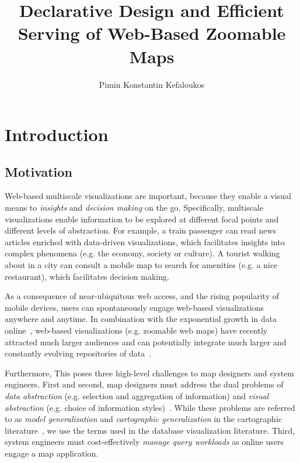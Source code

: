 \documentclass[11pt, oneside]{report}   	%
\title{Declarative Design and Efficient Serving of Web-Based Zoomable Maps}
\author{Pimin Konstantin Kefaloukos}
\begin{document}
\maketitle

\tableofcontents

\chapter{Introduction}

\section{Motivation}
Web-based multiscale visualizations are important, because they enable a visual means to \emph{insights} and \emph{decision making} on the go. Specifically, multiscale visualizations enable information to be explored at different focal points and different levels of abstraction. For example, a train passenger can read news articles enriched with data-driven visualizations, which facilitates insights into complex phenomena (e.g. the economy, society or culture). A tourist walking about in a city can consult a mobile map to search for amenities (e.g. a nice restaurant), which facilitates decision making.

As a consequence of near-ubiquitous web access, and the rising popularity of mobile devices, users can spontaneously engage web-based visualizations anywhere and anytime. In combination with the exponential growth in data online~\cite{foo,foo,foo}, web-based visualizations (e.g. zoomable web maps) have recently attracted much larger audiences and can potentially integrate much larger and constantly evolving repositories of data~\cite{gst, foo}.


Furthermore, 
This poses three high-level challenges to map designers and system engineers. First and second, map designers must address the dual problems of \emph{data abstraction} (e.g. selection and aggregation of information) and \emph{visual abstraction} (e.g. choice of information styles)~\cite{stolte2003multiscale}. While these problems are referred to as \emph{model generalization} and \emph{cartographic generalization} in the cartographic literature~\cite{foerster2007towards}, we use the terms used in the database visualization literature. Third, system engineers must cost-effectively \emph{manage query workloads} as online users engage a map application.
\end{document}

